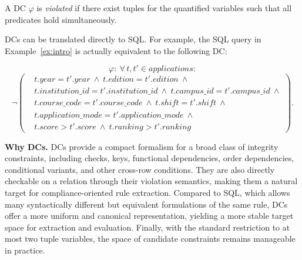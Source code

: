 A DC $\varphi$ is \emph{violated} if there exist tuples for the quantified variables such that all predicates hold simultaneously.

DCs can be translated directly to SQL.
For example, the SQL query in Example~\ref{ex:intro} is actually equivalent to the following DC:

\begingroup\small
\[
\varphi:\ \forall\, t, t' \in \mathit{applications}:
\]
\[ 
\neg\!\left(
\begin{aligned}
& t.\mathit{year}=t'.\mathit{year}\ \land\ t.\mathit{edition}=t'.\mathit{edition}\ \land \\
& t.\mathit{institution\_id}=t'.\mathit{institution\_id}\ \land\ t.\mathit{campus\_id}=t'.\mathit{campus\_id}\ \land \\
& t.\mathit{course\_code}=t'.\mathit{course\_code}\ \land\ t.\mathit{shift}=t'.\mathit{shift}\ \land \\
& t.\mathit{application\_mode}=t'.\mathit{application\_mode}\ \land \\
& t.\mathit{score}>t'.\mathit{score}\ \land\ t.\mathit{ranking}>t'.\mathit{ranking}
\end{aligned}
\right).
\]
\endgroup

\smallskip\noindent\textbf{Why DCs.}
DCs provide a compact formalism for a broad class of integrity constraints, including checks, keys, functional dependencies, order dependencies, conditional variants, and other cross-row conditions. They are also directly checkable on a relation through their violation semantics, making them a natural target for compliance-oriented rule extraction. Compared to SQL, which allows many syntactically different but equivalent formulations of the same rule, DCs offer a more uniform and canonical representation, yielding a more stable target space for extraction and evaluation. Finally, with the standard restriction to at most two tuple variables, the space of candidate constraints remains manageable in practice.







